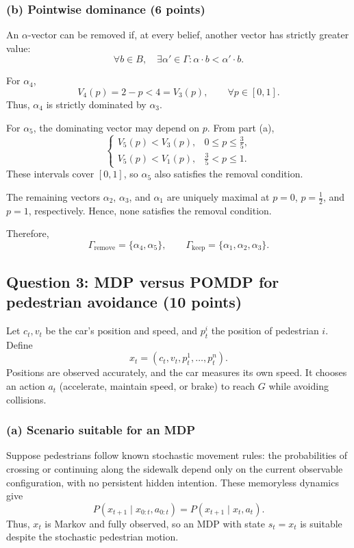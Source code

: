 \documentclass[11pt,a4paper]{article}
\begin{document}
\subsubsection*{(b) Pointwise dominance (6 points)}

An $\alpha$-vector can be removed if, at every belief,
another vector has strictly greater value:
\[
\forall b\in B,\quad
\exists\alpha'\in\Gamma:
\alpha\cdot b<\alpha'\cdot b.
\]

For $\alpha_4$,
\[
V_4(p)=2-p<4=V_3(p),\qquad \forall p\in[0,1].
\]
Thus, $\alpha_4$ is strictly dominated by $\alpha_3$.

For $\alpha_5$, the dominating vector may depend on $p$.
From part (a),
\[
\begin{cases}
V_5(p)<V_3(p), & 0\le p\le\frac35,\\
V_5(p)<V_1(p), & \frac35<p\le1.
\end{cases}
\]
These intervals cover $[0,1]$, so $\alpha_5$ also satisfies
the removal condition.

The remaining vectors $\alpha_2$, $\alpha_3$, and $\alpha_1$ are uniquely
maximal at $p=0$, $p=\frac12$, and $p=1$, respectively.
Hence, none satisfies the removal condition.

Therefore,
\[
\boxed{
\Gamma_{\mathrm{remove}}=\{\alpha_4,\alpha_5\},
\qquad
\Gamma_{\mathrm{keep}}=\{\alpha_1,\alpha_2,\alpha_3\}.
}
\]
\par
\endgroup

\clearpage
\subsection*{Question 3: MDP versus POMDP for pedestrian avoidance (10 points)}
\label{sec:a3}
\begingroup
\setlength{\parindent}{0pt}
\setlength{\parskip}{4pt}

Let $c_t,v_t$ be the car's position and speed, and $p_t^i$ the position
of pedestrian $i$. Define
\[
x_t=(c_t,v_t,p_t^1,\ldots,p_t^n).
\]
Positions are observed accurately, and the car measures its own speed.
It chooses an action $a_t$ (accelerate, maintain speed, or brake)
to reach $G$ while avoiding collisions.

\subsubsection*{(a) Scenario suitable for an MDP}

Suppose pedestrians follow known stochastic movement rules: the probabilities
of crossing or continuing along the sidewalk depend only on the current
observable configuration, with no persistent hidden intention.
These memoryless dynamics give
\[
P(x_{t+1}\mid x_{0:t},a_{0:t})
=P(x_{t+1}\mid x_t,a_t).
\]
Thus, $x_t$ is Markov and fully observed, so an MDP with state
$s_t=x_t$ is suitable despite the stochastic pedestrian motion.
\end{document}

